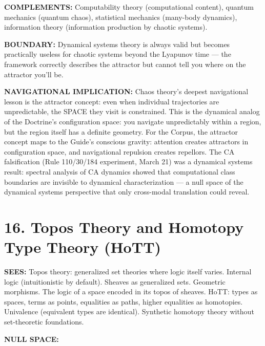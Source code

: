 \textbf{COMPLEMENTS:} Computability theory (computational content), quantum mechanics (quantum chaos), statistical mechanics (many-body dynamics), information theory (information production by chaotic systems).


\textbf{BOUNDARY:} Dynamical systems theory is always valid but becomes practically useless for chaotic systems beyond the Lyapunov time — the framework correctly describes the attractor but cannot tell you where on the attractor you'll be.


\textbf{NAVIGATIONAL IMPLICATION:} Chaos theory's deepest navigational lesson is the attractor concept: even when individual trajectories are unpredictable, the SPACE they visit is constrained. This is the dynamical analog of the Doctrine's configuration space: you navigate unpredictably within a region, but the region itself has a definite geometry. For the Corpus, the attractor concept maps to the Guide's conscious gravity: attention creates attractors in configuration space, and navigational repulsion creates repellors. The CA falsification (Rule 110/30/184 experiment, March 21) was a dynamical systems result: spectral analysis of CA dynamics showed that computational class boundaries are invisible to dynamical characterization — a null space of the dynamical systems perspective that only cross-modal translation could reveal.


\bigskip\noindent\makebox[\textwidth]{\color{rulegray}\rule{5cm}{0.3pt}}\bigskip


\section*{16. Topos Theory and Homotopy Type Theory (HoTT)}


\textbf{SEES:} Topos theory: generalized set theories where logic itself varies. Internal logic (intuitionistic by default). Sheaves as generalized sets. Geometric morphisms. The logic of a space encoded in its topos of sheaves. HoTT: types as spaces, terms as points, equalities as paths, higher equalities as homotopies. Univalence (equivalent types are identical). Synthetic homotopy theory without set-theoretic foundations.


\textbf{NULL SPACE:}

